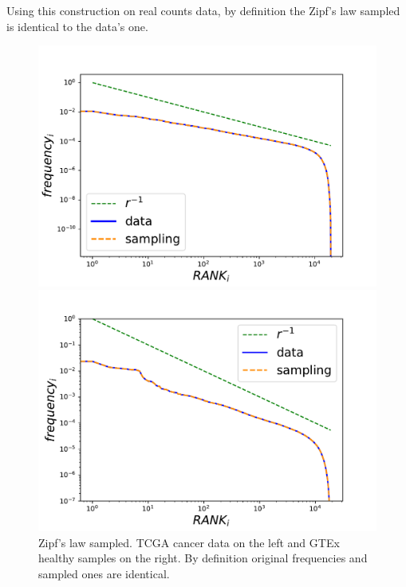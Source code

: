 Using this construction on real counts data, by definition the Zipf's law sampled is identical to the data's one.
\begin{figure}[htb!]
\begin{minipage}{0.5\textwidth}
    \centering
    \includegraphics[width=0.95\linewidth]{pictures/structure/tcga/globalzipf_null.pdf}
\end{minipage}
\hspace{2mm}
\begin{minipage}{0.5\textwidth}
    \centering
    \includegraphics[width=0.95\linewidth]{pictures/structure/gtex/globalzipf_null.pdf}
\end{minipage}
\caption{Zipf's law sampled. TCGA cancer data on the left and GTEx healthy samples on the right. By definition original frequencies and sampled ones are identical.}
\label{fig:structure/globalzipf_null}
\end{figure}
